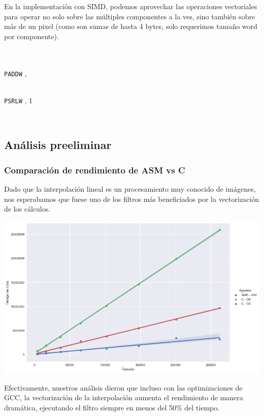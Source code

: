 En la implementación con SIMD, podemos aprovechar las operaciones vectoriales para operar no solo sobre las múltiples componentes a la ves, sino también sobre más de un pixel (como son sumas de hasta 4 bytes, solo requerimos tamaño word por componente).


\begin{center}

  \\

  \\

\texttt{PADDW} ,  \hfill

  \\

\texttt{PSRLW} , 1 \hfill

  \\

\end{center}

\subsection{Análisis preeliminar}
\subsubsection*{Comparación de rendimiento de ASM vs C}

Dado que la interpolación lineal es un procesamiento muy conocido de imágenes, nos esperabamos que fuese uno de los filtros más beneficiados por la vectorización de los cálculos.

\begin{center}
\includegraphics[scale=0.5]{img/linearZoom_CvsASMvsO3.png}
\end{center}

Efectivamente, nuestros análisis dieron que incluso con las optimizaciones de GCC, la vectorización de la interpolación aumenta el rendimiento de manera dramática, ejecutando el filtro siempre en menos del 50\% del tiempo.